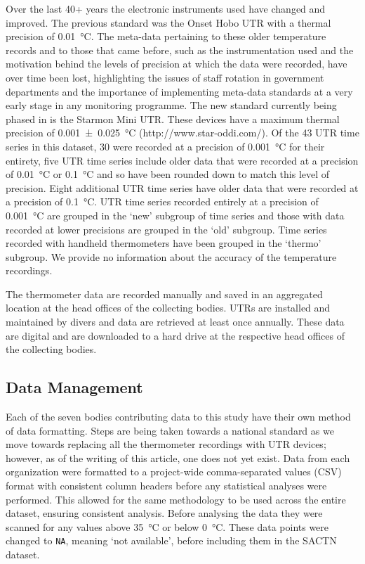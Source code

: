 \documentclass{ametsoc}
\begin{document}
Over the last 40+ years the electronic instruments used have changed and improved. The previous standard was the Onset Hobo UTR with a thermal precision of \SI{0.01}{\degreeCelsius}. The meta-data pertaining to these older temperature records and to those that came before, such as the instrumentation used and the motivation behind the levels of precision at which the data were recorded, have over time been lost, highlighting the issues of staff rotation in government departments and the importance of implementing meta-data standards at a very early stage in any monitoring programme. The new standard currently being phased in is the Starmon Mini UTR. These devices have a maximum thermal precision of \SI[separate-uncertainty = true, multi-part-units = repeat]{0.001(25)}{\degreeCelsius} (http://www.star-oddi.com/). Of the 43 UTR time series in this dataset, 30 were recorded at a precision of \SI{0.001}{\degreeCelsius} for their entirety, five UTR time series include older data that were recorded at a precision of \SI{0.01}{\degreeCelsius} or \SI{0.1}{\degreeCelsius} and so have been rounded down to match this level of precision. Eight additional UTR time series have older data that were recorded at a precision of \SI{0.1}{\degreeCelsius}. UTR time series recorded entirely at a precision of \SI{0.001}{\degreeCelsius} are grouped in the `new' subgroup of time series and those with data recorded at lower precisions are grouped in the `old' subgroup. Time series recorded with handheld thermometers have been grouped in the `thermo' subgroup. We provide no information about the accuracy of the temperature recordings.

The thermometer data are recorded manually and saved in an aggregated location at the head offices of the collecting bodies. UTRs are installed and maintained by divers and data are retrieved at least once annually. These data are digital and are downloaded to a hard drive at the respective head offices of the collecting bodies.

\subsection{Data Management}
Each of the seven bodies contributing data to this study have their own method of data formatting. Steps are being taken towards a national standard as we move towards replacing all the thermometer recordings with UTR devices; however, as of the writing of this article, one does not yet exist. Data from each organization were formatted to a project-wide comma-separated values (CSV) format with consistent column headers before any statistical analyses were performed. This allowed for the same methodology to be used across the entire dataset, ensuring consistent analysis. Before analysing the data they were scanned for any values above \SI{35}{\degreeCelsius} or below \SI{0}{\degreeCelsius}. These data points were changed to \texttt{NA}, meaning `not available', before including them in the SACTN dataset.
\end{document}
